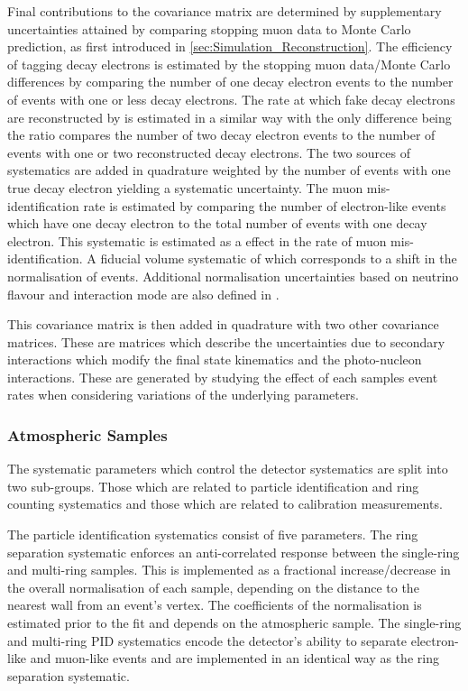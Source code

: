 Final contributions to the covariance matrix are determined by supplementary uncertainties attained by comparing stopping muon data to Monte Carlo prediction, as first introduced in \autoref{sec:Simulation_Reconstruction}. The efficiency of tagging decay electrons is estimated by the stopping muon data/Monte Carlo differences by comparing the number of one decay electron events to the number of events with one or less decay electrons. The rate at which fake decay electrons are reconstructed by \fq is estimated in a similar way with the only difference being the ratio compares the number of two decay electron events to the number of events with one or two reconstructed decay electrons. The two sources of systematics are added in quadrature weighted by the number of events with one true decay electron yielding a  systematic uncertainty. The muon mis-identification rate is estimated by comparing the number of electron-like events which have one decay electron to the total number of events with one decay electron. This systematic is estimated as a  effect in the rate of muon mis-identification. A fiducial volume systematic of  which corresponds to a  shift in the normalisation of events. Additional normalisation uncertainties based on neutrino flavour and interaction mode are also defined in \cite{t2k_tn_326, t2k_tn_186, t2k_tn_107}.

This covariance matrix is then added in quadrature with two other covariance matrices. These are matrices which describe the uncertainties due to secondary interactions which modify the final state kinematics and the photo-nucleon interactions. These are generated by studying the effect of each samples event rates when considering variations of the underlying parameters.

\subsubsection{Atmospheric Samples}
\label{sec:SelsAndSysts_Systs_AtmBeam}

The systematic parameters which control the detector systematics are split into two sub-groups. Those which are related to particle identification and ring counting systematics and those which are related to calibration measurements. 

The particle identification systematics consist of five parameters. The ring separation systematic enforces an anti-correlated response between the single-ring and multi-ring samples. This is implemented as a fractional increase/decrease in the overall normalisation of each sample, depending on the distance to the nearest wall from an event's vertex. The coefficients of the normalisation is estimated prior to the fit and depends on the atmospheric sample. The single-ring and multi-ring PID systematics encode the detector's ability to separate electron-like and muon-like events and are implemented in an identical way as the ring separation systematic.

